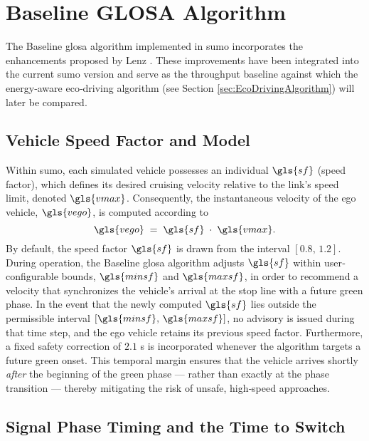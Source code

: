 \section{Baseline GLOSA Algorithm}
\label{sec:Baseline_Glosa_Algorithm}

The Baseline \ac{glosa} algorithm implemented in \ac{sumo} incorporates the enhancements proposed by Lenz \cite{Lenz2024}. These improvements have been integrated into the current \ac{sumo} version and serve as the throughput baseline against which the energy‐aware eco‐driving algorithm (see Section \ref{sec:EcoDrivingAlgorithm}) will later be compared.

\subsection{Vehicle Speed Factor and Model}
\label{sec:Glosa_Speed_Factor_Model}

Within \ac{sumo}, each simulated vehicle possesses an individual $\gls{sf}$ (speed factor), which defines its desired cruising velocity relative to the link’s speed limit, denoted $\gls{vmax}$. Consequently, the instantaneous velocity of the ego vehicle, $\gls{vego}$, is computed according to
\begin{equation}
\gls{vego} \;=\; \gls{sf} \;\cdot\; \gls{vmax}.
\end{equation}
By default, the speed factor $\gls{sf}$ is drawn from the interval $[0.8,\,1.2]$. During operation, the Baseline \ac{glosa} algorithm adjusts $\gls{sf}$ within user‐configurable bounds, $\gls{minsf}$ and $\gls{maxsf}$, in order to recommend a velocity that synchronizes the vehicle’s arrival at the stop line with a future green phase. In the event that the newly computed $\gls{sf}$ lies outside the permissible interval $[\gls{minsf},\,\gls{maxsf}]$, no advisory is issued during that time step, and the ego vehicle retains its previous speed factor. Furthermore, a fixed safety correction of $2.1$ s is incorporated whenever the algorithm targets a future green onset. This temporal margin ensures that the vehicle arrives shortly \emph{after} the beginning of the green phase --- rather than exactly at the phase transition --- thereby mitigating the risk of unsafe, high‐speed approaches.

\subsection{Signal Phase Timing and the Time to Switch}
\label{sec:Glosa_Signal_Phase_Timing}

